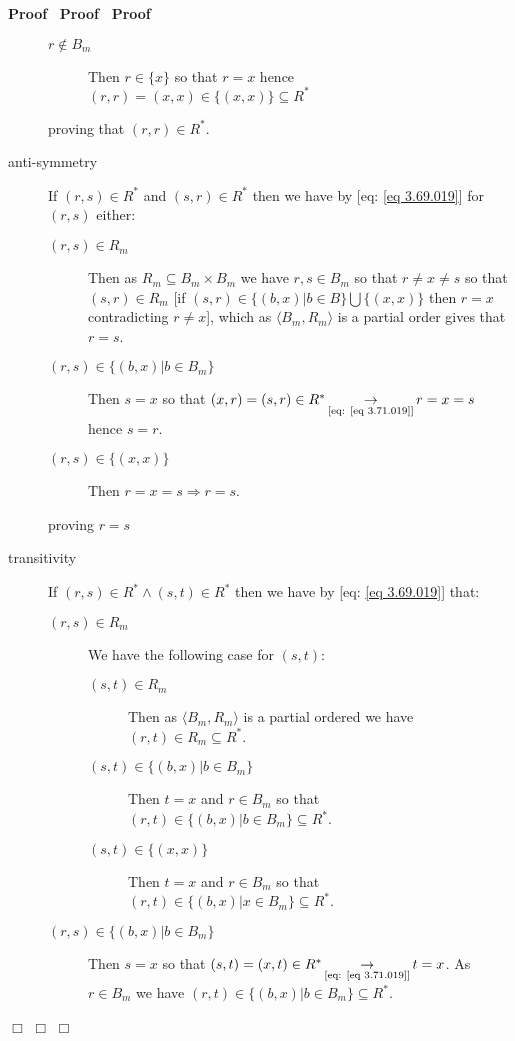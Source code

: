\documentclass{book}
\newcommand{\Rightarrowlim}{\mathop{\rightarrow}\limits}
\newcommand{\nin}{\not\in}
\newenvironment{proof}{\noindent\textbf{Proof\ }}{\hspace*{\fill}$\Box$\medskip}
\begin{document}
\begin{proof}
\begin{proof}
\begin{proof}
\begin{description}
\begin{description}
          \item[$r \nin B_m$] Then $r \in \{ x \}$ so that $r = x$ hence $(r,
          r) = (x, x) \in \{ (x, x) \} \subseteq R^{\ast}$
        \end{description}
        proving that $(r, r) \in R^{\ast}$.
        
        \item[anti-symmetry] If $(r, s) \in R^{\ast}$ and $(s, r) \in
        R^{\ast}$ then we have by [eq: \ref{eq 3.69.019}] for $(r, s)$ either:
        \begin{description}
          \item[$(r, s) \in R_m$] Then as $R_m \subseteq B_m \times B_m$ we
          have $r, s \in B_m$ so that $r \neq x \neq s$ so that $(s, r) \in
          R_m$ [if $(s, r) \in \{ (b, x) |b \in B \} \bigcup \{ (x, x) \}$
          then $r = x$ contradicting $r \neq x$], which as $\langle B_m, R_m
          \rangle$ is a partial order gives that $r = s$.
          
          \item[$(r, s) \in \{ (b, x) |b \in B_m \}$] Then $s = x$ so that
          $(x, r) = (s, r) \in R^{\ast} \Rightarrowlim_{\text{[eq: \ref{eq
          3.71.019}]}} r = x = s$ hence $s = r$.
          
          \item[$(r, s) \in \{ (x, x) \}$] Then $r = x = s \Rightarrow r = s$.
        \end{description}
        proving $r = s$
        
        \item[transitivity] If $(r, s) \in R^{\ast} \wedge (s, t) \in
        R^{\ast}$ then we have by [eq: \ref{eq 3.69.019}] that:
        \begin{description}
          \item[$(r, s) \in R_m $] We have the following case for $(s, t)$:
          \begin{description}
            \item[$(s, t) \in R_m$] Then as $\langle B_m, R_m \rangle$ is a
            partial ordered we have $(r, t) \in R_m \subseteq R^{\ast}$.
            
            \item[$(s, t) \in \{ (b, x) |b \in B_m \}$] Then $t = x$ and $r
            \in B_m$ so that $(r, t) \in \{ (b, x) |b \in B_m \} \subseteq
            R^{\ast}$.
            
            \item[$(s, t) \in \{ (x, x) \}$] Then $t = x$ and $r \in B_m$ so
            that $(r, t) \in \{ (b, x) |x \in B_m \} \subseteq R^{\ast}$.
          \end{description}
          \item[$(r, s) \in \{ (b, x) |b \in B_m \}$] Then $s = x$ so that
          $(s, t) = (x, t) \in R^{\ast} \Rightarrowlim_{\text{[eq: \ref{eq
          3.71.019}]}} t = x$. As $r \in B_m$ we have $(r, t) \in \{ (b, x) |b
          \in B_m \} \subseteq R^{\ast}$.
          

\end{description}
\end{description}
\end{proof}
\end{proof}
\end{proof}
\end{document}
